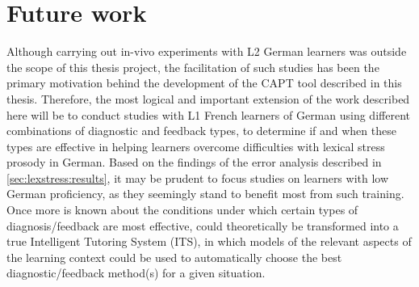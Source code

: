 % 
% 
 
 


\section{Future work}
\label{sec:conclusion:future}

Although carrying out in-vivo experiments with L2 German learners was outside the scope of this thesis project, the facilitation of such studies has been the primary motivation behind the development of the  CAPT tool described in this thesis. Therefore, the most logical and important extension of the work described here will be to conduct studies with L1 French learners of German using different combinations of diagnostic and feedback types, to determine if and when these types are effective in helping learners overcome difficulties with lexical stress prosody in German. 
	Based on the findings of the error analysis described in \cref{sec:lexstress:results}, it may be prudent to focus studies on learners with low German proficiency, as they seemingly stand to benefit most from such training.
	Once more is known about the conditions under which certain types of diagnosis/feedback are most effective,  could theoretically be transformed into a true Intelligent Tutoring System (ITS), in which models of the relevant aspects of the learning context could be used to automatically choose the best diagnostic/feedback method(s) for a given situation.

